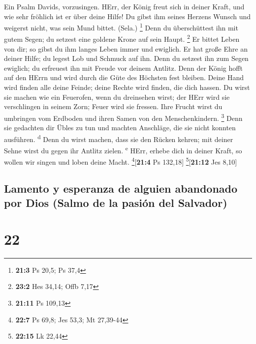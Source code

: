  Ein Psalm Davids, vorzusingen.  HErr, der
König freut sich in deiner Kraft, und wie sehr fröhlich ist er über
deine Hilfe!  Du gibst ihm seines Herzens Wunsch und
weigerst nicht, was sein Mund bittet. (Sela.) \footnote{\textbf{21:3} Ps
  20,5; Ps 37,4}  Denn du überschüttest ihn mit gutem
Segen; du setzest eine goldene Krone auf sein Haupt. \footnote{\textbf{23:2}
  Hes 34,14; Offb 7,17}  Er bittet Leben von dir; so gibst
du ihm langes Leben immer und ewiglich.  Er hat große Ehre
an deiner Hilfe; du legest Lob und Schmuck auf ihn.  Denn
du setzest ihn zum Segen ewiglich; du erfreuest ihn mit Freude vor
deinem Antlitz.  Denn der König hofft auf den HErrn und
wird durch die Güte des Höchsten fest bleiben.  Deine Hand
wird finden alle deine Feinde; deine Rechte wird finden, die dich
hassen.  Du wirst sie machen wie ein Feuerofen, wenn du
dreinsehen wirst; der HErr wird sie verschlingen in seinem Zorn; Feuer
wird sie fressen.  Ihre Frucht wirst du umbringen vom
Erdboden und ihren Samen von den Menschenkindern. \footnote{\textbf{21:11}
  Ps 109,13}  Denn sie gedachten dir Übles zu tun und
machten Anschläge, die sie nicht konnten ausführen. \textsuperscript{d}
 Denn du wirst machen, dass sie den Rücken kehren; mit
deiner Sehne wirst du gegen ihr Antlitz zielen. \textsuperscript{e}
 HErr, erhebe dich in deiner Kraft, so wollen wir singen
und loben deine Macht. \footnote{\textbf{22:7} Ps 69,8; Jes 53,3; Mt
  27,39-44}{[}\textbf{21:4} Ps 132,18{]} \footnote{\textbf{22:15} Lk
  22,44}{[}\textbf{21:12} Jes 8,10{]}

\hypertarget{lamento-y-esperanza-de-alguien-abandonado-por-dios-salmo-de-la-pasiuxf3n-del-salvador}{%
\subsection{Lamento y esperanza de alguien abandonado por Dios (Salmo de
la pasión del
Salvador)}\label{lamento-y-esperanza-de-alguien-abandonado-por-dios-salmo-de-la-pasiuxf3n-del-salvador}}

\hypertarget{section-21}{%
\section{22}\label{section-21}}

